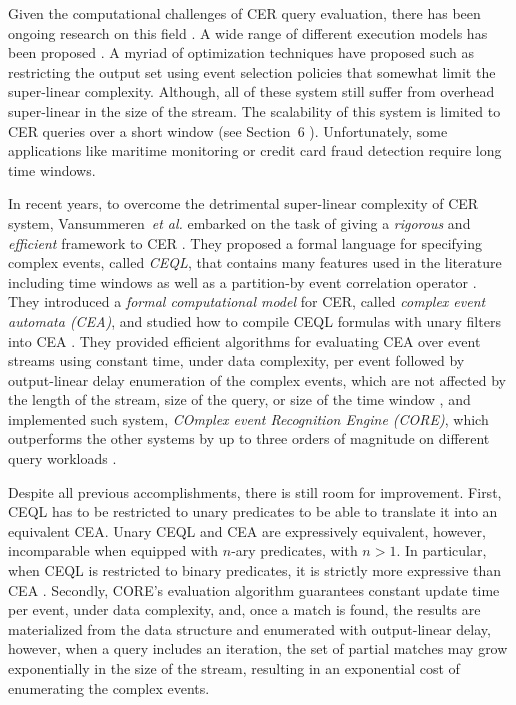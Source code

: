 Given the computational challenges of CER query evaluation, there has been ongoing research on this field \cite{research-evaluation-query, formal-framework-cer}. A wide range of different execution models has been proposed \cite{survey-systems-1, survey-systems-2}. A myriad of optimization techniques have proposed such as restricting the output set using event selection policies \cite{skip-till-any-match} that somewhat limit the super-linear complexity. Although, all of these system still suffer from overhead super-linear in the size of the stream. The scalability of this system is limited to CER queries over a short window (see Section~6 \cite{core}). Unfortunately, some applications like maritime monitoring \cite{maritime-monitoring} or credit card fraud detection \cite{fraud-detection} require long time windows.

In recent years, to overcome the detrimental super-linear complexity of CER system, Vansummeren~\textit{et al.} embarked on the task of giving a \emph{rigorous} and \emph{efficient} framework to CER \cite{formal-framework-cep, formal-framework-cer}. They proposed a formal language for specifying complex events, called \emph{CEQL}, that contains many features used in the literature including time windows as well as a partition-by event correlation operator \cite{on-the-expressiveness, core}. They introduced a \emph{formal computational model} for CER, called \emph{complex event automata (CEA)}, and studied how to compile CEQL formulas with unary filters into CEA \cite{formal-framework-cer}. They provided efficient algorithms for evaluating CEA over event streams using constant time, under data complexity, per event followed by output-linear delay enumeration of the complex events, which are not affected by the length of the stream, size of the query, or size of the time window \cite{formal-framework-cer, core}, and implemented such system, \emph{COmplex event Recognition Engine (CORE)}, which outperforms the other systems by up to three orders of magnitude on different query workloads \cite{core}.

Despite all previous accomplishments, there is still room for improvement. First, CEQL has to be restricted to unary predicates to be able to translate it into an equivalent CEA. Unary CEQL and CEA are expressively equivalent, however, incomparable when equipped with $n$-ary predicates, with $n > 1$. In particular, when CEQL is restricted to binary predicates, it is strictly more expressive than CEA \cite{on-the-expressiveness}. Secondly, CORE's evaluation algorithm guarantees constant update time per event, under data complexity, and, once a match is found, the results are materialized from the data structure and enumerated with output-linear delay, however, when a query includes an iteration, the set of partial matches may grow exponentially in the size of the stream, resulting in an exponential cost of enumerating the complex events.


